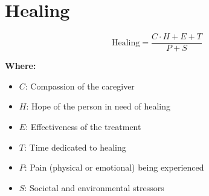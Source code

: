 \chapter{Healing}

\begin{equation}
\text{Healing} = \frac{C \cdot H + E + T}{P + S}
\end{equation}

\textbf{Where:}

\begin{itemize}
    \item $C$: Compassion of the caregiver
    \item $H$: Hope of the person in need of healing
    \item $E$: Effectiveness of the treatment
    \item $T$: Time dedicated to healing
    \item $P$: Pain (physical or emotional) being experienced
    \item $S$: Societal and environmental stressors
\end{itemize}